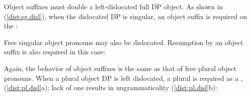 \documentclass[output=paper,
modfonts
]{langscibook}
\begin{document}
Object suffixes must double a left-dislocated full DP object. As shown in (\ref{dist:sg.disl}), when the dislocated DP is singular, an object suffix is required on the :

\begin{exe}
\ex \label{dist:sg.disl}
\begin{xlista}


\end{xlista}
\end{exe}

\noindent Free singular object pronouns may also be dislocated. Resumption by an object suffix is also required in this case: 

\begin{exe}
\ex \label{dist:pro.disl}
\begin{xlista}



\end{xlista}
\end{exe}

\noindent Again, the behavior of object suffixes is the same as that of free plural object pronouns. When a plural object DP is left dislocated, a plural  is required  as a , (\ref{dist:pl.disl}a); lack of one results in ungrammaticality (\ref{dist:pl.disl}b):

\begin{exe}
\ex \label{dist:pl.disl}
\begin{xlista}



\end{xlista}
\end{exe}
\end{document}
